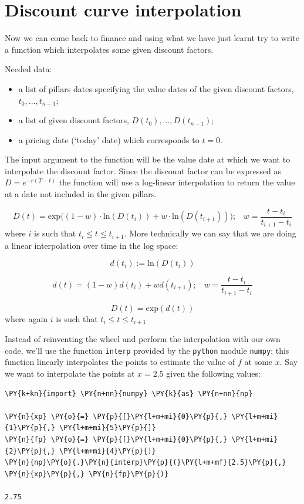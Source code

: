 \section{Discount curve interpolation}\label{discount-curve-interpolation}

Now we can come back to finance and using what we have just learnt try to write a function which interpolates some given discount factors.

Needed data:

\begin{itemize}
\tightlist
\item a list of pillars dates specifying the value dates of the given discount factors, \(t_0,...,t_{n-1}\);
\item a list of given discount factors, \(D(t_0),...,D(t_{n-1})\);
\item a pricing date (`today' date) which corresponds to \(t=0\).
\end{itemize}

The input argument to the function will be the value date at which we want to interpolate the discount factor. Since the discount factor can be expressed as \(D=e^{-r(T-t)}\) the function will use a log-linear interpolation to return the value at a date not included in the given pillars.

\[D(t) = \mathrm{exp}\Big( (1-w)\cdot \mathrm{ln}(D(t_i)) + w\cdot \mathrm{ln}(D(t_{i+1}))\Big);\;\;\;w=\frac{t-t_i}{t_{i+1}-t_i}\]
where \(i\) is such that \(t_i \le t \le t_{i+1}\). More technically we can say that we are doing a linear interpolation over time in the log space:

\[d(t_i):=\mathrm{ln}(D(t_i))\]

\[d(t) = (1-w)d(t_i) + wd(t_{i+1});\;\;\;w=\frac{t-t_i}{t_{i+1}-t_i}\]

\[D(t) = \mathrm{exp}(d(t))\]
where again \(i\) is such that \(t_i \le t \le t_{i+1}\)

Instead of reinventing the wheel and perform the interpolation with our own code, we'll use the function \texttt{interp} provided by the \texttt{python} module \texttt{numpy}; this function linearly interpolates the points to estimate the value of $f$ at some $x$.
Say we want to interpolate the points at $x = 2.5$ given the following values:

\begin{tcolorbox}[breakable, size=fbox, boxrule=1pt, pad at break*=1mm,colback=cellbackground, colframe=cellborder]
\begin{Verbatim}[commandchars=\\\{\}]
\PY{k+kn}{import} \PY{n+nn}{numpy} \PY{k}{as} \PY{n+nn}{np}

\PY{n}{xp} \PY{o}{=} \PY{p}{[}\PY{l+m+mi}{0}\PY{p}{,} \PY{l+m+mi}{1}\PY{p}{,} \PY{l+m+mi}{5}\PY{p}{]}
\PY{n}{fp} \PY{o}{=} \PY{p}{[}\PY{l+m+mi}{0}\PY{p}{,} \PY{l+m+mi}{2}\PY{p}{,} \PY{l+m+mi}{4}\PY{p}{]}
\PY{n}{np}\PY{o}{.}\PY{n}{interp}\PY{p}{(}\PY{l+m+mf}{2.5}\PY{p}{,} \PY{n}{xp}\PY{p}{,} \PY{n}{fp}\PY{p}{)}

2.75
\end{Verbatim}
\end{tcolorbox}

